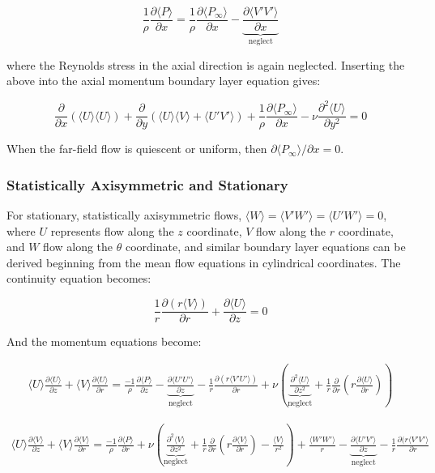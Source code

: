 \documentclass[10pt]{article}
\newcommand{\beq}{\begin{equation}}
\newcommand{\eeq}{\end{equation}}
\newcommand{\beqa}{\begin{equation}\begin{aligned}}
\newcommand{\eeqa}{\end{aligned}\end{equation}}
\newcommand{\la}{\langle}
\newcommand{\ra}{\rangle}
\begin{document}
\begin{flushleft}
\beq
\frac{1}{\rho}\frac{\partial \la P\ra}{\partial x}=\frac{1}{\rho}\frac{\partial \la P_{\infty}\ra}{\partial x}-\underbrace{\frac{\partial \la V'V'\ra}{\partial x}}_{\textrm{neglect}}
\eeq

where the Reynolds stress in the axial direction is again neglected. Inserting the above into the axial momentum boundary layer equation gives:

\beq
\frac{\partial}{\partial x}\left(\la U\ra\la U\ra\right)+\frac{\partial}{\partial y}\left(\la U\ra\la V\ra+\la U'V'\ra\right)+\frac{1}{\rho}\frac{\partial \la P_{\infty}\ra}{\partial x}-\nu\frac{\partial^2 \la U\ra}{\partial y^2}=0
\eeq

When the far-field flow is quiescent or uniform, then \(\partial\la P_{\infty}\ra/\partial x=0\). 



\subsubsection{Statistically Axisymmetric and Stationary}
For stationary, statistically axisymmetric flows, \(\la W\ra=\la V'W'\ra=\la U'W'\ra=0\), where \(U\) represents flow along the \(z\) coordinate, \(V\) flow along the \(r\) coordinate, and \(W\) flow along the \(\theta\) coordinate, and similar boundary layer equations can be derived beginning from the mean flow equations in cylindrical coordinates. The continuity equation becomes:

\beq
\frac{1}{r}\frac{\partial (r\la V\ra)}{\partial r}+\frac{\partial \la U\ra}{\partial z}=0
\eeq

And the momentum equations become:

\beqa
\la U\ra\frac{\partial \la U\ra}{\partial z}+\la V\ra\frac{\partial \la U\ra}{\partial r}=\frac{-1}{\rho}\frac{\partial \la P\ra}{\partial z}-\underbrace{\frac{\partial \la U'U'\ra}{\partial z}}_{\textrm{neglect}}-\frac{1}{r}\frac{\partial (r\la V'U'\ra)}{\partial r}+\nu\left(\underbrace{\frac{\partial^2\la U\ra}{\partial z^2}}_{\textrm{neglect}}+\frac{1}{r}\frac{\partial}{\partial r}\left(r\frac{\partial\la U\ra}{\partial r}\right)\right)
\eeqa

\beqa
\la U\ra\frac{\partial \la V\ra}{\partial z}+\la V\ra\frac{\partial\la V\ra}{\partial r}=\frac{-1}{\rho}\frac{\partial \la P\ra}{\partial r}+\nu\left(\underbrace{\frac{\partial^2\la V\ra}{\partial z^2}}_{\textrm{neglect}}+\frac{1}{r}\frac{\partial}{\partial r}\left(r\frac{\partial\la V\ra}{\partial r}\right)-\frac{\la V\ra}{r^2}\right)+\frac{\la W'W'\ra}{r}-\underbrace{\frac{\partial \la U'V'\ra}{\partial z}}_{\textrm{neglect}}-\frac{1}{r}\frac{\partial(r\la V'V'\ra}{\partial r}\\
\eeqa


\end{flushleft}
\end{document}
